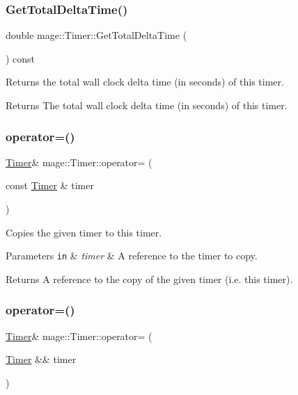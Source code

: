 \subsubsection{\texorpdfstring{Get\+Total\+Delta\+Time()}{GetTotalDeltaTime()}}
{\footnotesize\ttfamily double mage\+::\+Timer\+::\+Get\+Total\+Delta\+Time (\begin{DoxyParamCaption}{ }\end{DoxyParamCaption}) const}

Returns the total wall clock delta time (in seconds) of this timer.

\begin{DoxyReturn}{Returns}
The total wall clock delta time (in seconds) of this timer. 
\end{DoxyReturn}
\hypertarget{classmage_1_1_timer_ae83df63d5ff9eec370eddf208ac2077e}{}\label{classmage_1_1_timer_ae83df63d5ff9eec370eddf208ac2077e} 
\subsubsection{\texorpdfstring{operator=()}{operator=()}\hspace{0.1cm}{\footnotesize\ttfamily [1/2]}}
{\footnotesize\ttfamily \hyperlink{classmage_1_1_timer}{Timer}\& mage\+::\+Timer\+::operator= (\begin{DoxyParamCaption}\item[{const \hyperlink{classmage_1_1_timer}{Timer} \&}]{timer }\end{DoxyParamCaption})\hspace{0.3cm}{\ttfamily [default]}}

Copies the given timer to this timer.


\begin{DoxyParams}[1]{Parameters}
\mbox{\tt in}  & {\em timer} & A reference to the timer to copy. \\
\hline
\end{DoxyParams}
\begin{DoxyReturn}{Returns}
A reference to the copy of the given timer (i.\+e. this timer). 
\end{DoxyReturn}
\hypertarget{classmage_1_1_timer_a93f3a9d730bebd189af904568e5b7ecd}{}\label{classmage_1_1_timer_a93f3a9d730bebd189af904568e5b7ecd} 
\subsubsection{\texorpdfstring{operator=()}{operator=()}\hspace{0.1cm}{\footnotesize\ttfamily [2/2]}}
{\footnotesize\ttfamily \hyperlink{classmage_1_1_timer}{Timer}\& mage\+::\+Timer\+::operator= (\begin{DoxyParamCaption}\item[{\hyperlink{classmage_1_1_timer}{Timer} \&\&}]{timer }\end{DoxyParamCaption})\hspace{0.3cm}{\ttfamily [default]}}

